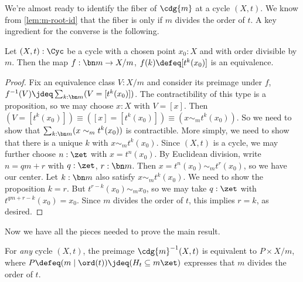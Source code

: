 We're almost ready to identify the fiber of $\cdg{m}$ at a cycle $(X,t)$.
We know from \cref{lem:m-root-id} that the fiber
is \nonempty only if $m$ divides the order of $t$.
A key ingredient for the converse is the following.
\begin{lemma}\label{lem:X-mod-m-chosen}
  Let $(X,t):\Cyc$ be a cycle with a chosen point $x_0:X$
  and with order divisible by $m$.
  Then the map $f : \bn m \to X/m$, $f(k) \defeq [t^k(x_0)]$
  is an equivalence.
\end{lemma}
\begin{proof}
  Fix an equivalence class $V:X/m$ and consider its preimage under $f$,
  $f^{-1}(V) \jdeq \sum_{k:\bn m}(V=[t^k(x_0)])$.
  The contractibility of this type is a proposition, so we may choose
  $x:X$ with $V=[x]$.
  Then $(V=[t^k(x_0)])\equiv([x]=[t^k(x_0)])\equiv(x\sim_m t^k(x_0))$.
  So we need to show that $\sum_{k:\bn m}(x\sim_m t^k(x_0))$ is contractible.
  More simply, we need to show that there is a unique $k$ with $x\sim_m t^k(x_0)$.
  Since $(X,t)$ is a cycle, we may further choose $n:\zet$ with $x=t^n(x_0)$.
  By Euclidean division, write $n=qm+r$ with $q:\zet$, $r:\bn m$.
  Then $x = t^n(x_0) \sim_m t^r(x_0)$, so we have our center.
  Let $k:\bn m$ also satisfy $x\sim_m t^k(x_0)$.
  We need to show the proposition $k=r$.
  But $t^{r-k}(x_0) \sim_m x_0$, so we may take $q:\zet$ with $t^{qm+r-k}(x_0)=x_0$.
  Since $m$ divides the order of $t$, this implies $r=k$, as desired.
\end{proof}
Now we have all the pieces needed to prove the main result.
\begin{theorem}\label{thm:fiber-cdg}
  For \emph{any} cycle $(X,t)$, the preimage $\cdg{m}^{-1}(X,t)$
  is equivalent to $P\times X/m$,
  where $P\defeq (m \mid \ord(t)) \jdeq (H_t \subseteq m\zet)$
  expresses that $m$ divides the order of $t$.
\end{theorem}
